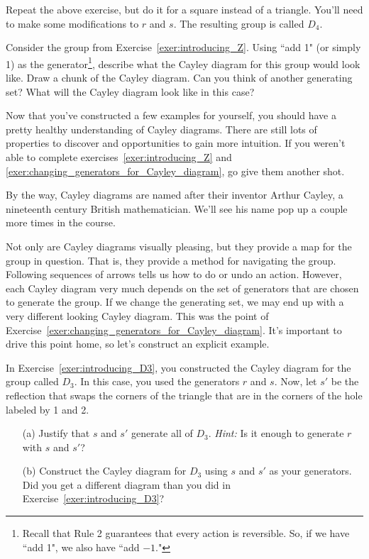 \begin{exercise}\label{exer:introducing_D4}
Repeat the above exercise, but do it for a square instead of a triangle.  You'll need to make some modifications to \(r\) and \(s\).  The resulting group is called \(D_4\).
\end{exercise}

\begin{exercise}
Consider the group from Exercise~\ref{exer:introducing_Z}.  Using ``add 1" (or simply 1) as the generator\footnote{Recall that Rule 2 guarantees that every action is reversible.  So, if we have ``add 1", we also have ``add \(-1\)."}, describe what the Cayley diagram for this group would look like.  Draw a chunk of the Cayley diagram.  Can you think of another generating set?  What will the Cayley diagram look like in this case?
\end{exercise}

Now that you've constructed a few examples for yourself, you should have a pretty healthy understanding of Cayley diagrams.  There are still lots of properties to discover and opportunities to gain more intuition.  If you weren't able to complete exercises~\ref{exer:introducing_Z} and \ref{exer:changing_generators_for_Cayley_diagram}, go give them another shot.

By the way, Cayley diagrams are named after their inventor Arthur Cayley, a nineteenth century British mathematician.  We'll see his name pop up a couple more times in the course.  

Not only are Cayley diagrams visually pleasing, but they provide a map for the group in question.  That is, they provide a method for navigating the group.  Following sequences of arrows tells us how to do or undo an action.  However, each Cayley diagram very much depends on the set of generators that are chosen to generate the group.  If we change the generating set, we may end up with a very different looking Cayley diagram.  This was the point of Exercise~\ref{exer:changing_generators_for_Cayley_diagram}.  It's important to drive this point home, so let's construct an explicit example.

\begin{exercise}\label{exer:alternate_D3}
In Exercise~\ref{exer:introducing_D3}, you constructed the Cayley diagram for the group called \(D_3\).  In this case, you used the generators \(r\) and \(s\).  Now, let \(s'\) be the reflection that swaps the corners of the triangle that are in the corners of the hole labeled by 1 and 2.  
\begin{enumerate}
\item[(a)] Justify that \(s\) and \(s'\) generate all of \(D_3\).  \emph{Hint:} Is it enough to generate \(r\) with \(s\) and \(s'\)?
\item[(b)] Construct the Cayley diagram for \(D_3\) using \(s\) and \(s'\) as your generators.  Did you get a different diagram than you did in Exercise~\ref{exer:introducing_D3}?
\end{enumerate}
\end{exercise}


